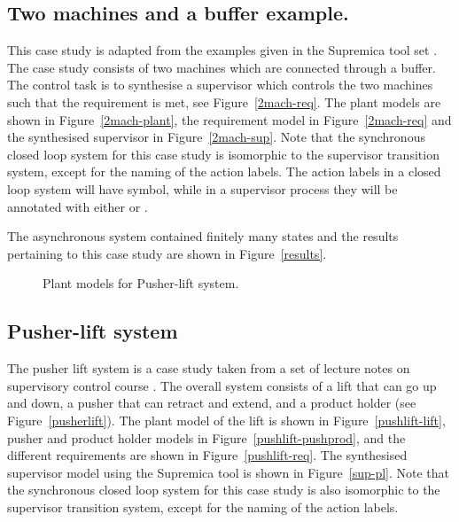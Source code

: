 \documentclass[a4paper,english,final]{article}
\theoremstyle{plain}
\theoremstyle{definition}
\begin{document}
\subsection{Two machines and a buffer example.}\label{subsec-2machbuf}
This case study is adapted from the examples given in the Supremica tool set \cite{supremica}. The case study consists of two machines which are connected through a buffer. The control task is to synthesise a supervisor which controls the two machines such that the requirement is met, see Figure~\ref{2mach-req}. The plant models are shown in Figure~\ref{2mach-plant}, the requirement model in Figure~\ref{2mach-req} and the synthesised supervisor in Figure~\ref{2mach-sup}. Note that the synchronous closed loop system for this case study is isomorphic to the supervisor transition system, except for the naming of the action labels. The action labels in a closed loop system will have  symbol, while in a supervisor process they will be annotated with either  or .

The asynchronous system contained finitely many states and the results pertaining to this case study are shown in Figure~\ref{results}.

\begin{figure}\centering
{}
\caption{Plant models for Pusher-lift system.}\label{plantmodels-pl}
\end{figure}

\subsection{Pusher-lift system }\label{subsec-pl}
The pusher lift system is a case study taken from a set of lecture notes on supervisory control course \cite{4k460}. The overall system consists of a lift that can go up and down, a pusher that can retract and extend, and a product holder (see Figure~\ref{pusherlift}). The plant model of the lift is shown in Figure~\ref{pushlift-lift}, pusher and product holder models in Figure~\ref{pushlift-pushprod}, and the different requirements are shown in Figure~\ref{pushlift-req}. The synthesised supervisor model using the Supremica tool is shown in Figure~\ref{sup-pl}. Note that the synchronous closed loop system for this case study is also isomorphic to the supervisor transition system, except for the naming of the action labels.
\end{document}
